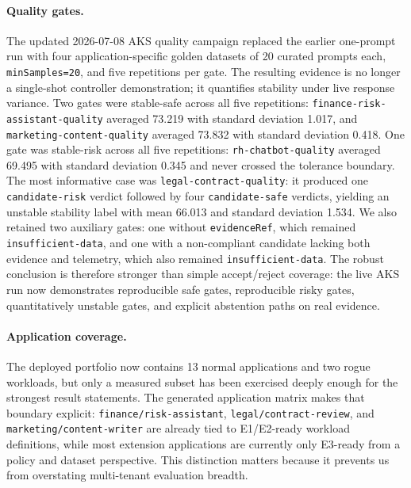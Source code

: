 \paragraph{Quality gates.}
The updated 2026-07-08 AKS quality campaign replaced the earlier one-prompt run with four application-specific golden datasets of 20 curated prompts each, \texttt{minSamples=20}, and five repetitions per gate. The resulting evidence is no longer a single-shot controller demonstration; it quantifies stability under live response variance. Two gates were stable-safe across all five repetitions: \texttt{finance-risk-assistant-quality} averaged 73.219 with standard deviation 1.017, and \texttt{marketing-content-quality} averaged 73.832 with standard deviation 0.418. One gate was stable-risk across all five repetitions: \texttt{rh-chatbot-quality} averaged 69.495 with standard deviation 0.345 and never crossed the tolerance boundary. The most informative case was \texttt{legal-contract-quality}: it produced one \texttt{candidate-risk} verdict followed by four \texttt{candidate-safe} verdicts, yielding an unstable stability label with mean 66.013 and standard deviation 1.534. We also retained two auxiliary gates: one without \texttt{evidenceRef}, which remained \texttt{insufficient-data}, and one with a non-compliant candidate lacking both evidence and telemetry, which also remained \texttt{insufficient-data}. The robust conclusion is therefore stronger than simple accept/reject coverage: the live AKS run now demonstrates reproducible safe gates, reproducible risky gates, quantitatively unstable gates, and explicit abstention paths on real evidence.

\begin{table}[t]
\centering
\small

\caption{Detailed AKS \texttt{AIQualityGate} outcomes from the latest E3 campaign.}
\end{table}

\paragraph{Application coverage.}
The deployed portfolio now contains 13 normal applications and two rogue workloads, but only a measured subset has been exercised deeply enough for the strongest result statements. The generated application matrix makes that boundary explicit: \texttt{finance/risk-assistant}, \texttt{legal/contract-review}, and \texttt{marketing/content-writer} are already tied to E1/E2-ready workload definitions, while most extension applications are currently only E3-ready from a policy and dataset perspective. This distinction matters because it prevents us from overstating multi-tenant evaluation breadth.

